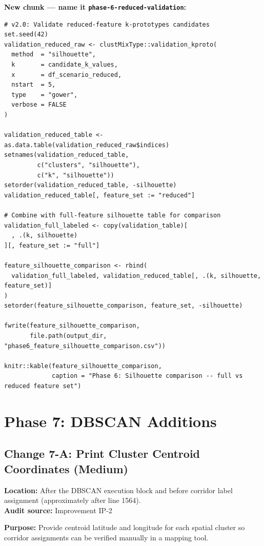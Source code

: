 \documentclass[11pt]{article}
\newcommand{\rcode}[1]{\texttt{#1}}
\begin{document}
\textbf{New chunk --- name it \rcode{phase-6-reduced-validation}:}
\begin{lstlisting}
# v2.0: Validate reduced-feature k-prototypes candidates
set.seed(42)
validation_reduced_raw <- clustMixType::validation_kproto(
  method  = "silhouette",
  k       = candidate_k_values,
  x       = df_scenario_reduced,
  nstart  = 5,
  type    = "gower",
  verbose = FALSE
)

validation_reduced_table <- as.data.table(validation_reduced_raw$indices)
setnames(validation_reduced_table,
         c("clusters", "silhouette"),
         c("k", "silhouette"))
setorder(validation_reduced_table, -silhouette)
validation_reduced_table[, feature_set := "reduced"]

# Combine with full-feature silhouette table for comparison
validation_full_labeled <- copy(validation_table)[
  , .(k, silhouette)
][, feature_set := "full"]

feature_silhouette_comparison <- rbind(
  validation_full_labeled, validation_reduced_table[, .(k, silhouette, feature_set)]
)
setorder(feature_silhouette_comparison, feature_set, -silhouette)

fwrite(feature_silhouette_comparison,
       file.path(output_dir, "phase6_feature_silhouette_comparison.csv"))

knitr::kable(feature_silhouette_comparison,
             caption = "Phase 6: Silhouette comparison -- full vs reduced feature set")
\end{lstlisting}

\section{Phase 7: DBSCAN Additions}

\subsection{Change 7-A: Print Cluster Centroid Coordinates (Medium)}

\textbf{Location:} After the DBSCAN execution block and before corridor
label assignment (approximately after line 1564).\\
\textbf{Audit source:} Improvement IP-2

\textbf{Purpose:} Provide centroid latitude and longitude for each spatial
cluster so corridor assignments can be verified manually in a mapping tool.
\end{document}
